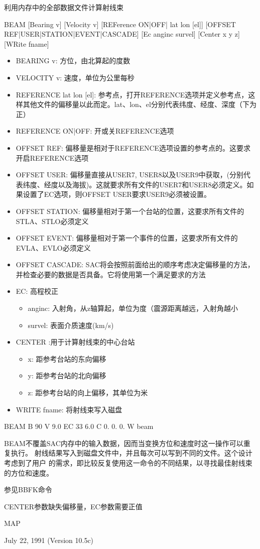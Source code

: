 \label{cmd:beam}

利用内存中的全部数据文件计算射线束

BEAM [Bearing v] [Velocity v] [REFerence ON|OFF| lat lon [el]] [OFFSET REF|USER|STATION|EVENT|CASCADE] [Ec anginc survel] [Center x y z] [WRite fname]

\begin{itemize}
\item BEARING v: 方位，由北算起的度数
\item VELOCITY v: 速度，单位为公里每秒
\item REFERENCE lat lon [el]: 参考点，打开REFERENCE选项并定义参考点，这样其他文件的偏移量以此而定。lat、lon、el分别代表纬度、经度、深度（下为正）
\item REFERENCE ON|OFF: 开或关REFERENCE选项
\item OFFSET REF: 偏移量是相对于REFERENCE选项设置的参考点的。这要求开启REFERENCE选项
\item OFFSET USER: 偏移量直接从USER7, USER8以及USER9中获取，(分别代表纬度、经度以及海拔)。这就要求所有文件的USER7和USER8必须定义。如果设置了EC选项，则OFFSET USER要求USER9必须被设置。
\item OFFSET STATION: 偏移量相对于第一个台站的位置，这要求所有文件的STLA、STLO必须定义
\item OFFSET EVENT: 偏移量相对于第一个事件的位置，这要求所有文件的EVLA、EVLO必须定义
\item OFFSET CASCADE: SAC将会按照前面给出的顺序考虑决定偏移量的方法，并检查必要的数据是否具备。它将使用第一个满足要求的方法
\item EC: 高程校正
	\begin{itemize}
	\item anginc: 入射角，从z轴算起，单位为度（震源距离越远，入射角越小
	\item survel: 表面介质速度(km/s)
	\end{itemize} 
\item CENTER :用于计算射线束的中心台站
	\begin{itemize}
	\item x: 距参考台站的东向偏移
	\item y: 距参考台站的北向偏移
	\item z: 距参考台站的向上偏移，其单位为米
	\end{itemize}
\item WRITE fname: 将射线束写入磁盘
\end{itemize}

BEAM  B 90  V 9.0 EC 33  6.0 C  0. 0. 0. W beam

BEAM不覆盖SAC内存中的输入数据，因而当变换方位和速度时这一操作可以重复执行。
射线结果写入到磁盘文件中，并且每次可以写到不同的文件。这个设计考虑到了用户
的需求，即比较反复使用这一命令的不同结果，以寻找最佳射线束的方位和速度。

参见BBFK命令

CENTER参数缺失偏移量，EC参数需要正值

MAP

July 22, 1991 (Version 10.5c)

